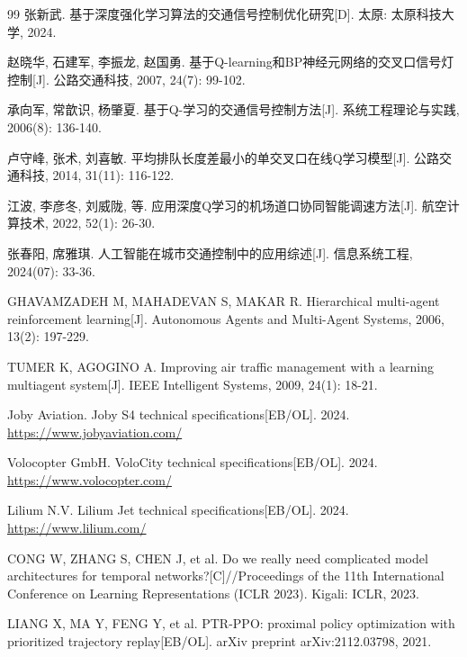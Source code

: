\documentclass[12pt,a4paper,UTF8]{ctexart}
\begin{document}
\begin{thebibliography}{99}
 张新武. 基于深度强化学习算法的交通信号控制优化研究[D]. 太原: 太原科技大学, 2024.

 赵晓华, 石建军, 李振龙, 赵国勇. 基于Q-learning和BP神经元网络的交叉口信号灯控制[J]. 公路交通科技, 2007, 24(7): 99-102.

 承向军, 常歆识, 杨肇夏. 基于Q-学习的交通信号控制方法[J]. 系统工程理论与实践, 2006(8): 136-140.

 卢守峰, 张术, 刘喜敏. 平均排队长度差最小的单交叉口在线Q学习模型[J]. 公路交通科技, 2014, 31(11): 116-122.

 江波, 李彦冬, 刘威陇, 等. 应用深度Q学习的机场道口协同智能调速方法[J]. 航空计算技术, 2022, 52(1): 26-30.

 张春阳, 席雅琪. 人工智能在城市交通控制中的应用综述[J]. 信息系统工程, 2024(07): 33-36.

 GHAVAMZADEH M, MAHADEVAN S, MAKAR R. Hierarchical multi-agent reinforcement learning[J]. Autonomous Agents and Multi-Agent Systems, 2006, 13(2): 197-229.

 TUMER K, AGOGINO A. Improving air traffic management with a learning multiagent system[J]. IEEE Intelligent Systems, 2009, 24(1): 18-21.

 Joby Aviation. Joby S4 technical specifications[EB/OL]. 2024. \url{https://www.jobyaviation.com/}

 Volocopter GmbH. VoloCity technical specifications[EB/OL]. 2024. \url{https://www.volocopter.com/}

 Lilium N.V. Lilium Jet technical specifications[EB/OL]. 2024. \url{https://www.lilium.com/}

 CONG W, ZHANG S, CHEN J, et al. Do we really need complicated model architectures for temporal networks?[C]//Proceedings of the 11th International Conference on Learning Representations (ICLR 2023). Kigali: ICLR, 2023.

 LIANG X, MA Y, FENG Y, et al. PTR-PPO: proximal policy optimization with prioritized trajectory replay[EB/OL]. arXiv preprint arXiv:2112.03798, 2021.

\end{thebibliography}
\end{document}
